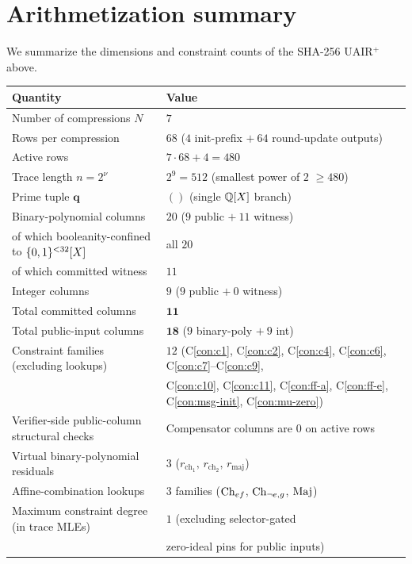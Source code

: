 \section{Arithmetization summary}\label{sec:summary}

We summarize the dimensions and constraint counts of the SHA-256
UAIR$^+$ above.

\begin{center}
\small
\begin{tabular}{ll}
\toprule
\textbf{Quantity} & \textbf{Value} \\
\midrule
Number of compressions $N$        & $7$ \\
Rows per compression              & $68$ \quad ($4$ init-prefix $+\ 64$ round-update outputs) \\
Active rows                       & $7 \cdot 68 + 4 = 480$ \\
Trace length $n = 2^{\nu}$        & $2^{9} = 512$ \quad (smallest power of $2$ $\ge 480$) \\
Prime tuple $\mathbf{q}$          & $()$ \quad (single $\mathbb{Q}[X]$ branch) \\
\midrule
Binary-polynomial columns         & $20$ \quad ($9$ public $+\ 11$ witness) \\
\quad of which booleanity-confined to $\{0,1\}^{<32}[X]$ & all $20$  \\
\quad of which committed witness  & $11$ \\
Integer columns                   & $9$ \quad ($9$ public $+\ 0$ witness) \\
\midrule
Total committed columns           & $\mathbf{11}$ \\
Total public-input columns        & $\mathbf{18}$ \quad ($9$ binary-poly $+\ 9$ int) \\
\midrule
Constraint families (excluding lookups) & $12$ \quad (C\ref{con:c1}, C\ref{con:c2}, C\ref{con:c4}, C\ref{con:c6}, C\ref{con:c7}--C\ref{con:c9}, \\
                                  & \phantom{$12$ \quad } C\ref{con:c10}, C\ref{con:c11}, C\ref{con:ff-a}, C\ref{con:ff-e}, C\ref{con:msg-init}, C\ref{con:mu-zero}) \\
Verifier-side public-column structural checks &  Compensator columns are $0$ on active rows \\
Virtual binary-polynomial residuals & $3$ \quad ($r_{\mathrm{ch}_1},\,r_{\mathrm{ch}_2},\,r_{\mathrm{maj}}$) \\
Affine-combination lookups        & $3$ families ($\operatorname{Ch}_{ef}$, $\operatorname{Ch}_{\neg e,g}$, $\operatorname{Maj}$) \\
\midrule
Maximum constraint degree (in trace MLEs) & $1$ \quad (excluding selector-gated\\ &\quad zero-ideal pins for public inputs) \\
\bottomrule
\end{tabular}
\end{center}


